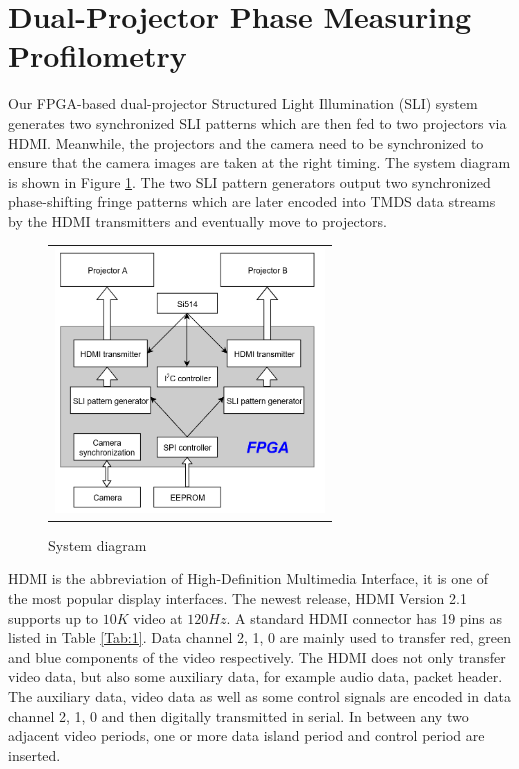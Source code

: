 \documentclass[]{spie}  %
\begin{document}
\section{Dual-Projector Phase Measuring Profilometry}
Our FPGA-based dual-projector Structured Light Illumination (SLI) system generates two synchronized SLI patterns which are then fed to two projectors via HDMI. Meanwhile, the projectors and the camera need to be synchronized to ensure that the camera images are taken at the right timing. The system diagram is shown in Figure \ref{Fig:1}. The two SLI pattern generators output two synchronized phase-shifting fringe patterns which are later encoded into TMDS data streams by the HDMI transmitters and eventually move to projectors. 

\begin{figure}
   \begin{center}
   \begin{tabular}{c}
   \includegraphics[height=7cm]{sysdg.png}
   \end{tabular}
   \end{center}
   \caption{System diagram}
   \label{Fig:1}
   \end{figure} 

HDMI is the abbreviation of High-Definition Multimedia Interface, it is one of the most popular display interfaces. The newest release, HDMI Version 2.1 supports up to $10K$ video at $120 Hz$. A standard HDMI connector has 19 pins as listed in Table \ref{Tab:1}. Data channel 2, 1, 0 are mainly used to transfer red, green and blue components of the video respectively. The HDMI does not only transfer video data, but also some auxiliary data, for example audio data, packet header. The auxiliary data, video data as well as some control signals are encoded in data channel 2, 1, 0 and then digitally transmitted in serial. In between any two adjacent video periods, one or more data island period and control period are inserted. 
\end{document}
